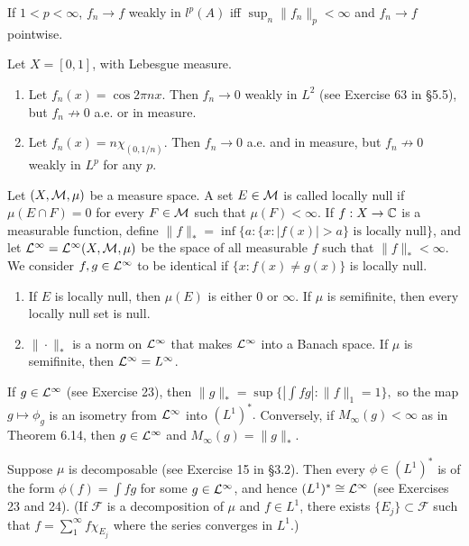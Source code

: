 \documentclass[12pt, a4paper]{article}
\begin{document}
\begin{problem}\label{prob:6-21}
If $1<p<\infty$, $f_{n}\rightarrow f$ weakly in $l^{p}(A)$ iff $\sup_{n}\|f_{n}\|_{p}<\infty$ and $f_{n}\rightarrow f$ pointwise.
\end{problem}

\begin{problem}\label{prob:6-22}
Let $X=[0,1]$, with Lebesgue measure.
\begin{enumerate}[label=\alph*.]
\item Let $f_{n}(x)=\cos2\pi nx.$ Then $f_{n}\rightarrow0$ weakly in $L^{2}$ (see Exercise 63 in \S 5.5), but $f_{n}\not\rightarrow0$ a.e. or in measure.
\item Let $f_{n}(x)=n\chi_{(0,1/n)}$. Then $f_{n}\rightarrow0$ a.e. and in measure, but $f_{n}\not\rightarrow0$ weakly in $L^{p}$ for any $p$.
\end{enumerate}
\end{problem}

\begin{problem}\label{prob:6-23}
Let $(X,\mathcal{M},\mu)$ be a measure space. A set $E\in\mathcal{M}$ is called locally null if $\mu(E\cap F)=0$ for every $F\in\mathcal{M}$ such that $\mu(F)<\infty.$ If $f:X\rightarrow\mathbb{C}$ is a measurable function, define $\|f\|_{*}=\inf\{a:\{x:|f(x)|>a\} \text{ is locally null}\}$, and let $\mathcal{L}^{\infty}=\mathcal{L}^{\infty}(X,\mathcal{M},\mu)$ be the space of all measurable $f$ such that $\|f\|_{*}<\infty$. We consider $f,g\in\mathcal{L}^{\infty}$ to be identical if $\{x:f(x)\ne g(x)\}$ is locally null.
\begin{enumerate}[label=\alph*.]
\item If $E$ is locally null, then $\mu(E)$ is either $0$ or $\infty$. If $\mu$ is semifinite, then every locally null set is null.
\item $\|\cdot\|_{*}$ is a norm on $\mathcal{L}^{\infty}$ that makes $\mathcal{L}^{\infty}$ into a Banach space. If $\mu$ is semifinite, then $\mathcal{L}^{\infty}=L^{\infty}$.
\end{enumerate}
\end{problem}

\begin{problem}\label{prob:6-24}
If $g\in\mathcal{L}^{\infty}$ (see Exercise 23), then $\|g\|_{*}=\sup\{|\int fg|:\|f\|_{1}=1\},$ so the map $g\mapsto\phi_{g}$ is an isometry from $\mathcal{L}^{\infty}$ into $(L^{1})^{*}.$ Conversely, if $M_{\infty}(g)<\infty$ as in Theorem 6.14, then $g\in\mathcal{L}^{\infty}$ and $M_{\infty}(g)=\|g\|_{*}$.
\end{problem}

\begin{problem}\label{prob:6-25}
Suppose $\mu$ is decomposable (see Exercise 15 in \S 3.2). Then every $\phi\in(L^{1})^{*}$ is of the form $\phi(f)=\int fg$ for some $g\in\mathcal{L}^{\infty}$, and hence $(L^{1})^{*}\cong\mathcal{L}^{\infty}$ (see Exercises 23 and 24). (If $\mathcal{F}$ is a decomposition of $\mu$ and $f\in L^{1}$, there exists $\{E_{j}\}\subset\mathcal{F}$ such that $f=\sum_{1}^{\infty}f\chi_{E_{j}}$ where the series converges in $L^{1}$.)
\end{problem}
\end{document}
